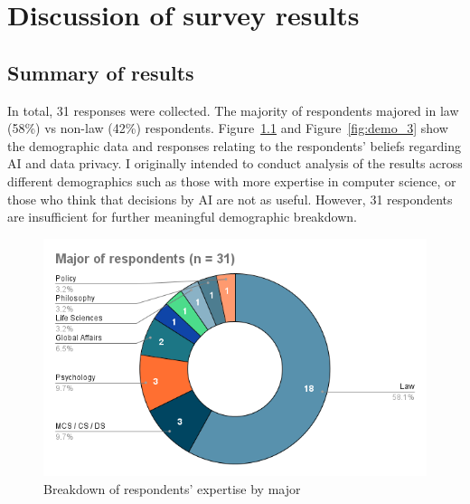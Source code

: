 \chapter{Discussion of survey results}

\label{chapter4}

\section{Summary of results}
In total, 31 responses were collected. The majority of respondents majored in law (58\%) vs non-law (42\%) respondents. Figure~\ref{fig:demo_1} and Figure~\ref{fig:demo_3} show the demographic data and responses relating to the respondents' beliefs regarding AI and data privacy. I originally intended to conduct analysis of the results across different demographics such as those with more expertise in computer science, or those who think that decisions by AI are not as useful. However, 31 respondents are insufficient for further meaningful demographic breakdown.

\begin{figure}[!ht]
  \centering
  \includegraphics[width=0.85\linewidth]{figures/major_respondents.png}
  \caption{Breakdown of respondents' expertise by major}
  \label{fig:demo_1}
\end{figure}

